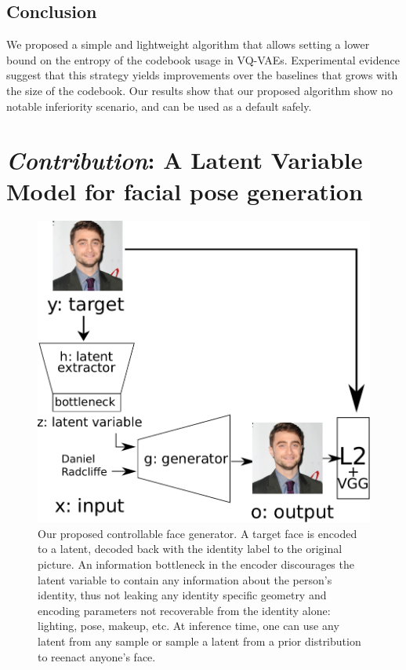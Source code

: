 \subsection{Conclusion}

We proposed a simple and lightweight algorithm that allows setting a lower bound on the entropy of the codebook usage in VQ-VAEs. Experimental evidence suggest that this strategy yields improvements over the baselines that grows with the size of the codebook. Our results show that our proposed algorithm show no notable inferiority scenario, and can be used as a default safely. 

\section{\emph{\arr Contribution}: A Latent Variable Model for facial pose generation}

\begin{figure}[ht]
    \centering
    \includegraphics[scale=0.75]{60-files/latent-facegen.pdf}
    \caption{Our proposed controllable face generator. A target face is encoded to a latent, decoded back with the identity label to the original picture. An information bottleneck in the encoder discourages the latent variable to contain any information about the person's identity, thus not leaking any identity specific geometry and encoding parameters not recoverable from the identity alone: lighting, pose, makeup, etc. At inference time, one can use any latent from any sample or sample a latent from a prior distribution to reenact anyone's face.}
    \label{fig:latent-facegen}
\end{figure}

